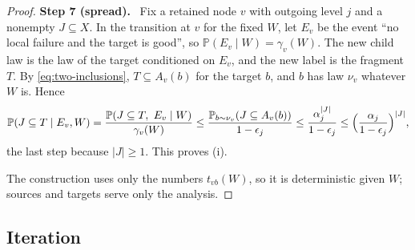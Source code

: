 \documentclass[11pt]{article}
\numberwithin{equation}{section}
\newcommand{\PP}{\mathbb P}
\newcommand{\step}[1]{\par\smallskip\noindent\textbf{Step #1.}\ }
\begin{document}
\begin{proof}
\step{7 (spread)} Fix a retained node $v$ with outgoing level $j$ and a
nonempty $J\subseteq X$. In the transition at $v$ for the fixed $W$, let
$E_v$ be the event ``no local failure and the target is good'', so
$\PP(E_v\mid W)=\gamma_v(W)$. The new child law is the law of the target
conditioned on $E_v$, and the new label is the fragment $T$. By
\eqref{eq:two-inclusions}, $T\subseteq A_v(b)$ for the target $b$, and
$b$ has law $\nu_v$ whatever $W$ is. Hence
\[
 \PP(J\subseteq T\mid E_v,W)
 =\frac{\PP(J\subseteq T,\ E_v\mid W)}{\gamma_v(W)}
 \le\frac{\PP_{b\sim\nu_v}(J\subseteq A_v(b))}{1-\epsilon_j}
 \le\frac{\alpha_j^{|J|}}{1-\epsilon_j}
 \le\Bigl(\frac{\alpha_j}{1-\epsilon_j}\Bigr)^{|J|},
\]
the last step because $|J|\ge1$. This proves (i).

The construction uses only the numbers $t_{vb}(W)$, so it is
deterministic given $W$; sources and targets serve only the analysis.
\end{proof}

\subsection{Iteration}
\end{document}
